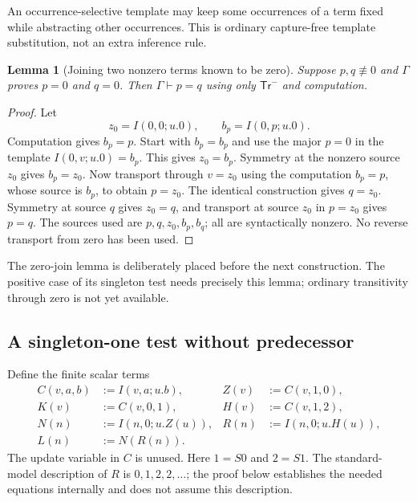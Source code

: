 \documentclass[11pt,a4paper]{article}
\newtheorem{lemma}[theorem]{Lemma}
\theoremstyle{definition}\newtheorem{definition}[theorem]{Definition}
\begin{document}
An occurrence-selective template may keep some occurrences of a term
fixed while abstracting other occurrences. This is ordinary
capture-free template substitution, not an extra inference rule.

\begin{lemma}[Joining two nonzero terms known to be zero]
\label{zs:zero-join}
Suppose $p,q\not\equiv0$ and $\Gamma$ proves $p=0$ and $q=0$.
Then $\Gamma\vdash p=q$ using only $\mathsf{Tr}^{-}$ and computation.
\end{lemma}
\begin{proof}
Let
\[
 z_0=I(0,0;u.0),\qquad b_p=I(0,p;u.0).
\]
Computation gives $b_p=p$. Start with $b_p=b_p$ and use the major
$p=0$ in the template $I(0,v;u.0)=b_p$. This gives $z_0=b_p$.
Symmetry at the nonzero source $z_0$ gives $b_p=z_0$.
Now transport through $v=z_0$ using the computation $b_p=p$, whose
source is $b_p$, to obtain $p=z_0$.
The identical construction gives $q=z_0$. Symmetry at source $q$
gives $z_0=q$, and transport at source $z_0$ in $p=z_0$ gives $p=q$.
The sources used are $p,q,z_0,b_p,b_q$; all are syntactically nonzero.
No reverse transport from zero has been used.
\end{proof}

The zero-join lemma is deliberately placed before the next construction.
The positive case of its singleton test needs precisely this lemma;
ordinary transitivity through zero is not yet available.

\subsection{A singleton-one test without predecessor}

Define the finite scalar terms
\[
\begin{aligned}
 C(v,a,b)&:=I(v,a;u.b),& Z(v)&:=C(v,1,0),\\
 K(v)&:=C(v,0,1),& H(v)&:=C(v,1,2),\\
 N(n)&:=I(n,0;u.Z(u)),& R(n)&:=I(n,0;u.H(u)),\\
 L(n)&:=N(R(n)).
\end{aligned}
\tag{Tests}\label{zs:tests}
\]
The update variable in $C$ is unused. Here $1=S0$ and $2=S1$.
The standard-model description of $R$ is $0,1,2,2,\ldots$; the proof
below establishes the needed equations internally and does not assume
this description.
\end{document}

